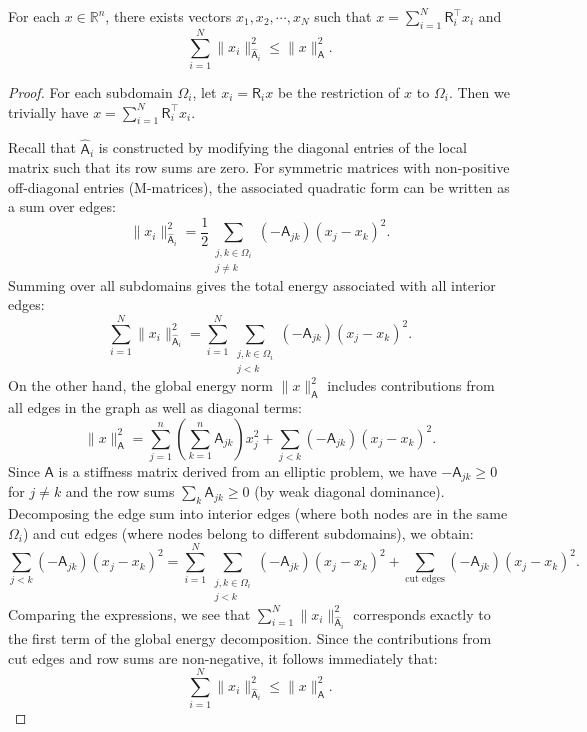 \documentclass[10pt,a4paper]{amsart}
\begin{document}
  \begin{lemma}
    For each $x\in \mathbb{R}^{n}$, there exists vectors
    $x_{1}, x_{2}, \cdots, x_{N}$ such that
    $x = \sum_{i=1}^{N}\mathsf{R}_{i}^{\intercal}x_{i}$ and
    \[
      \sum_{i=1}^{N}\|x_{i}\|_{\widehat{\mathsf{A}}_{i}}^{2}\leq \|x\|_{\mathsf{A}}
      ^{2}.
    \]
  \end{lemma}

  \begin{proof}
    For each subdomain $\Omega_{i}$, let $x_{i}= \mathsf{R}_{i}x$ be the
    restriction of $x$ to $\Omega_{i}$. Then we trivially have $x = \sum_{i=1}^{N}
    \mathsf{R}_{i}^{\intercal}x_{i}$.

    Recall that $\widehat{\mathsf{A}}_{i}$ is constructed by modifying the diagonal
    entries of the local matrix such that its row sums are zero. For symmetric
    matrices with non-positive off-diagonal entries (M-matrices), the associated
    quadratic form can be written as a sum over edges:
    \[
      \|x_{i}\|_{\widehat{\mathsf{A}}_{i}}^{2}= \frac{1}{2}\sum_{\substack{j,k \in \Omega_i \\ j \neq k}}
      (-\mathsf{A}_{jk}) (x_{j}- x_{k})^{2}.
    \]
    Summing over all subdomains gives the total energy associated with all
    interior edges:
    \[
      \sum_{i=1}^{N}\|x_{i}\|_{\widehat{\mathsf{A}}_{i}}^{2}= \sum_{i=1}^{N}\sum_{\substack{j,k \in \Omega_i \\ j < k}}
      (-\mathsf{A}_{jk}) (x_{j}- x_{k})^{2}.
    \]
    On the other hand, the global energy norm $\|x\|_{\mathsf{A}}^{2}$ includes
    contributions from all edges in the graph as well as diagonal terms:
    \[
      \|x\|_{\mathsf{A}}^{2}= \sum_{j=1}^{n}\left(\sum_{k=1}^{n}\mathsf{A}_{jk}\right
      )x_{j}^{2}+ \sum_{j < k}(-\mathsf{A}_{jk})(x_{j}- x_{k})^{2}.
    \]
    Since $\mathsf{A}$ is a stiffness matrix derived from an elliptic problem,
    we have $-\mathsf{A}_{jk}\ge 0$ for $j \neq k$ and the row sums
    $\sum_{k}\mathsf{A}_{jk}\ge 0$ (by weak diagonal dominance). Decomposing the
    edge sum into interior edges (where both nodes are in the same $\Omega_{i}$)
    and cut edges (where nodes belong to different subdomains), we obtain:
    \[
      \sum_{j < k}(-\mathsf{A}_{jk})(x_{j}- x_{k})^{2}= \sum_{i=1}^{N}\sum_{\substack{j,k \in \Omega_i \\ j < k}}
      (-\mathsf{A}_{jk}) (x_{j}- x_{k})^{2}+ \sum_{\text{cut edges}}(-\mathsf{A}_{jk}
      )(x_{j}- x_{k})^{2}.
    \]
    Comparing the expressions, we see that
    $\sum_{i=1}^{N}\|x_{i}\|_{\widehat{\mathsf{A}}_{i}}^{2}$ corresponds exactly
    to the first term of the global energy decomposition. Since the contributions
    from cut edges and row sums are non-negative, it follows immediately that:
    \[
      \sum_{i=1}^{N}\|x_{i}\|_{\widehat{\mathsf{A}}_{i}}^{2}\le \|x\|_{\mathsf{A}}
      ^{2}.
    \]
  \end{proof}
\end{document}

